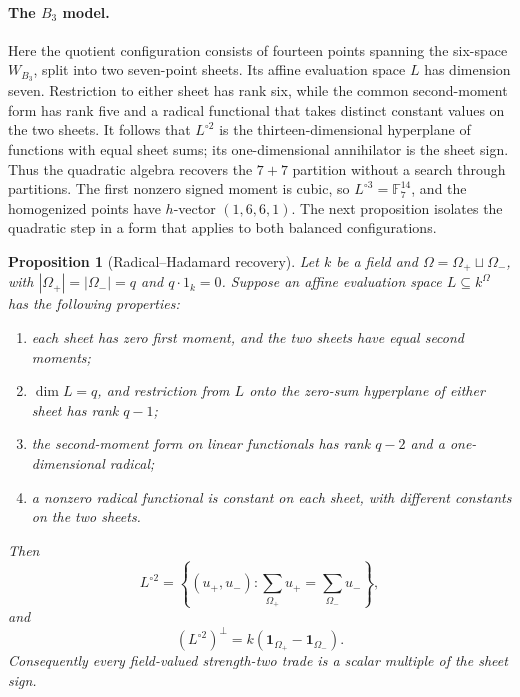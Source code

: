 \documentclass[11pt]{article}
\newtheorem{proposition}[theorem]{Proposition}
\theoremstyle{definition}
\theoremstyle{remark}
\newcommand{\F}{\mathbb{F}}
\begin{document}
\paragraph{The \(B_3\) model.}
Here the quotient configuration consists of fourteen points spanning
the six-space \(W_{B_3}\), split into two seven-point sheets.  Its
affine evaluation space \(L\) has dimension seven.  Restriction to
either sheet has rank six, while the common second-moment form has rank
five and a radical functional that takes distinct constant values on
the two sheets.  It follows that \(L^{\circ2}\) is the
thirteen-dimensional hyperplane of functions with equal sheet sums;
its one-dimensional annihilator is the sheet sign.  Thus the quadratic
algebra recovers the \(7+7\) partition without a search through
partitions.  The first nonzero signed moment is cubic, so
\(L^{\circ3}=\F_7^{14}\), and the homogenized points have
\(h\)-vector \((1,6,6,1)\).  The next proposition isolates the
quadratic step in a form that applies to both balanced configurations.

\begin{proposition}[Radical--Hadamard recovery]
\label{prop:radical-hadamard}
Let \(k\) be a field and
\(\Omega=\Omega_+\sqcup\Omega_-\), with
\(|\Omega_+|=|\Omega_-|=q\) and \(q\cdot1_k=0\).  Suppose an affine evaluation space
\(L\subseteq k^\Omega\) has the following properties:
\begin{enumerate}[label=\textup{(\roman*)},leftmargin=*]
\item each sheet has zero first moment, and the two sheets have equal
second moments;
\item \(\dim L=q\), and restriction from \(L\) onto the zero-sum
hyperplane of either sheet has rank \(q-1\);
\item the second-moment form on linear functionals has rank \(q-2\)
and a one-dimensional radical;
\item a nonzero radical functional is constant on each sheet, with
different constants on the two sheets.
\end{enumerate}
Then
\[
 L^{\circ2}
 =\left\{(u_+,u_-):
   \sum_{\Omega_+}u_+=\sum_{\Omega_-}u_-\right\},              \tag{4.1}
\]
and
\[
 (L^{\circ2})^\perp
 =k(\mathbf1_{\Omega_+}-\mathbf1_{\Omega_-}).                 \tag{4.2}
\]
Consequently every field-valued strength-two trade is a scalar multiple
of the sheet sign.
\end{proposition}
\end{document}
